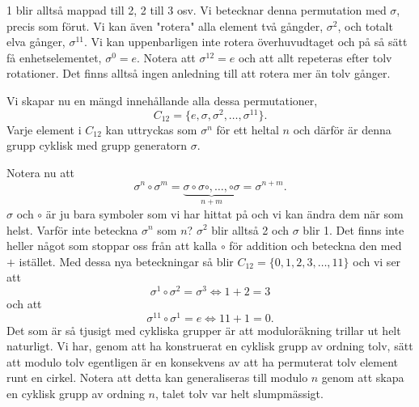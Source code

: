 \documentclass{article}
\theoremstyle{definition}
\begin{document}
\begin{center}
\end{center}
1 blir alltså mappad till 2, 2 till 3 osv. Vi betecknar denna permutation med $\sigma$,
precis som förut. Vi kan även "rotera" alla element två gångder, $\sigma^2$,
och totalt elva gånger, $\sigma^{11}$. Vi kan uppenbarligen inte rotera överhuvudtaget 
och på så sätt få enhetselementet, $\sigma^0 = e.$
Notera att $\sigma^{12} = e$ och att allt repeteras efter tolv rotationer. 
Det finns alltså ingen anledning till att rotera mer än tolv gånger.

Vi skapar nu en mängd innehållande alla dessa permutationer, 
\[C_{12} = \{e, \sigma, \sigma^2, \ldots, \sigma^{11}\}.\] 
Varje element i $C_{12}$ kan
uttryckas som $\sigma^n$ för ett heltal $n$ och därför är denna grupp cyklisk med grupp generatorn $\sigma$.

Notera nu att 
\[\sigma^n \circ \sigma^m = 
\underbrace{\sigma \circ \sigma \circ, \ldots, \circ \sigma}_{\text{$n + m$}} = \sigma^{n+m}.\]
$\sigma$ och $\circ$ är ju bara symboler som vi har hittat på och vi kan ändra dem när som helst. 
Varför inte beteckna $\sigma^n$ som $n$? $\sigma^2$ blir alltså 2 och $\sigma$ blir 1. 
Det finns inte heller något som stoppar oss från att kalla $\circ$ för addition och beteckna den 
med $+$ istället. Med dessa nya beteckningar så blir
$C_{12} = \{0, 1, 2, 3, \ldots, 11\}$ 
och vi ser att
\[\sigma^1 \circ \sigma^2 = \sigma^3 \iff 1 + 2 = 3\]
och att 
\[\sigma^{11} \circ \sigma^1 = e \iff 11 + 1 = 0.\]
Det som är så tjusigt med cykliska grupper är att moduloräkning trillar ut helt naturligt. 
Vi har, genom att ha konstruerat en cyklisk grupp av ordning tolv, 
sätt att modulo tolv egentligen är en konsekvens av 
att ha permuterat tolv element runt en cirkel. Notera att detta kan generaliseras till 
modulo $n$ genom att skapa en cyklisk grupp av ordning $n$, talet tolv var helt slumpmässigt.
\end{document}
